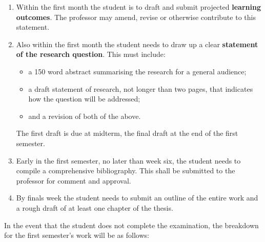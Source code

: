 \documentclass[titlepage]{article}
\begin{document}
\begin{enumerate}
 \item Within the first month the student is to draft and submit
   projected \textbf{learning outcomes}. The professor may amend, revise
   or otherwise contribute to this statement.
 \item Also within the first month the student needs to draw up a clear
   \textbf{statement of the research question}. This must include:
\begin{itemize}
  \item a 150 word abstract summarising the research for a general audience;
  \item a draft statement of research, not longer than two pages, that indicates how the question will be addressed;
  \item and a revision of both of the above.
 \end{itemize}
 The first draft is due at midterm, the final draft at the end of the first semester.
 \item Early in the first semester, no later than week six, the student needs to compile a comprehensive bibliography. This shall be submitted to the professor for comment and approval.
 \item By finals week the student needs to submit an outline of the entire work and a rough draft of at least one chapter of the thesis.
\end{enumerate}

In the event that the student does not complete the examination, the breakdown for the first semester's work will be as follows:
\end{document}
